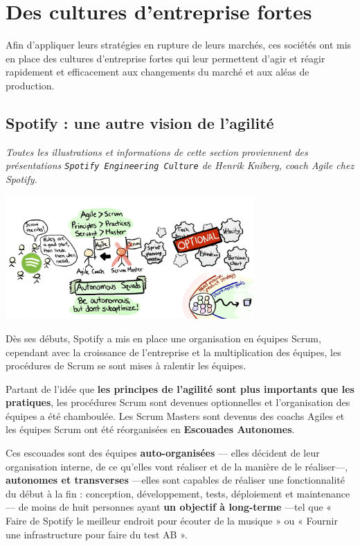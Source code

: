 \chapter{Des cultures d'entreprise fortes}

Afin d'appliquer leurs stratégies en rupture de leurs marchés, ces sociétés ont mis en place des cultures d'entreprise fortes qui leur permettent d'agir et réagir rapidement et efficacement aux changements du marché et aux aléas de production.

\section{Spotify : une autre vision de l'agilité}

\textit{Toutes les illustrations et informations de cette section proviennent des présentations \texttt{Spotify Engineering Culture}\supercite{SpotifyEngineeringCulturePart1}\supercite{SpotifyEngineeringCulturePart2} de Henrik Kniberg, coach Agile chez Spotify.}

\begin{center}
\includegraphics[width=95mm]{./images_spotify/agile_scrum}
\end{center}

Dès ses débuts, Spotify a mis en place une organisation en équipes Scrum, cependant avec la croissance de l'entreprise et la multiplication des équipes, les procédures de Scrum se sont mises à ralentir les équipes.

Partant de l'idée que \textbf{les principes de l'agilité sont plus importants que les pratiques}, les procédures Scrum sont devenues optionnelles et l'organisation des équipes a été chamboulée. Les Scrum Masters sont devenus des coachs Agiles et les équipes Scrum ont été réorganisées en \textbf{Escouades Autonomes}.

Ces escouades sont des équipes \textbf{auto-organisées} --- elles décident de leur organisation interne, de ce qu'elles vont réaliser et de la manière de le réaliser---, \textbf{autonomes et transverses} ---elles sont capables de réaliser une fonctionnalité du début à la fin : conception, développement, tests, déploiement et maintenance--- de moins de huit personnes ayant \textbf{un objectif à long-terme} ---tel que « Faire de Spotify le meilleur endroit pour écouter de la musique » ou « Fournir une infrastructure pour faire du test AB ».

